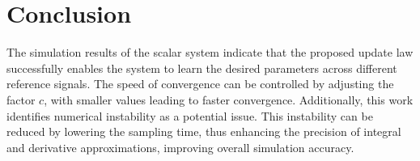 \section{Conclusion}
The simulation results of the scalar system indicate that the proposed update law successfully enables the system to learn the desired parameters across different reference signals. The speed of convergence can be controlled by adjusting the factor $c$, with smaller values leading to faster convergence. Additionally, this work identifies numerical instability as a potential issue. This instability can be reduced by lowering the sampling time, thus enhancing the precision of integral and derivative approximations, improving overall simulation accuracy.